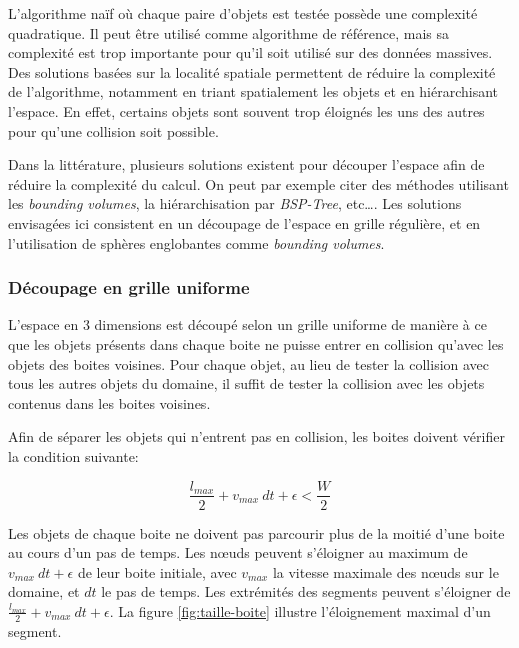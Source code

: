 \documentclass[11pt,class=article,float=false,crop=false]{standalone}
\begin{document}
L'algorithme naïf où chaque paire d'objets est testée possède une complexité quadratique. Il peut être utilisé comme algorithme de référence, mais sa complexité est trop importante pour qu'il soit utilisé sur des données massives. Des solutions basées sur la localité spatiale permettent de réduire la complexité de l'algorithme, notamment en triant spatialement les objets et en hiérarchisant l'espace. En effet, certains objets sont souvent trop éloignés les uns des autres pour qu'une collision soit possible.

Dans la littérature, plusieurs solutions existent pour découper l'espace afin de réduire la complexité du calcul. On peut par exemple citer des méthodes utilisant les \textit{bounding volumes}, la hiérarchisation par \textit{BSP-Tree}, etc\dots {}. Les solutions envisagées ici consistent en un découpage de l'espace en grille régulière, et en l'utilisation de sphères englobantes comme \textit{bounding volumes}.

\subsubsection{Découpage en grille uniforme}
L'espace en 3 dimensions est découpé selon un grille uniforme de manière à ce que les objets présents dans chaque boite ne puisse entrer en collision qu'avec les objets des boites voisines. Pour chaque objet, au lieu de tester la collision avec tous les autres objets du domaine, il suffit de tester la collision avec les objets contenus dans les boites voisines.

Afin de séparer les objets qui n'entrent pas en collision, les boites doivent vérifier la condition suivante:

\begin{equation}
\frac{l_{max}}{2} + v_{max}~dt + \epsilon < \frac{W}{2}
\end{equation}

Les objets de chaque boite ne doivent pas parcourir plus de la moitié d'une boite au cours d'un pas de temps. Les nœuds peuvent s'éloigner au maximum de $v_{max}~dt + \epsilon$ de leur boite initiale, avec $v_{max}$ la vitesse maximale des nœuds sur le domaine, et $dt$ le pas de temps. Les extrémités des segments peuvent s'éloigner de $\frac{l_{max}}{2} + v_{max}~dt + \epsilon$. La figure \ref{fig:taille-boite} illustre l'éloignement maximal d'un segment.
\end{document}
